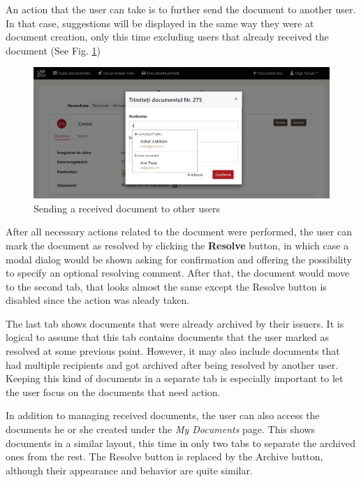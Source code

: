 An action that the user can take is to further send the document to another user. In that case, suggestions will be displayed in the same way they were at document creation, only this time excluding users that already received the document (See Fig. \ref{resendModal})

\begin{figure}[ht]
    \centering
    \includegraphics[width=5.5in]{images/app/received_resend_modal}
    \caption{Sending a received document to other users}
    \label{resendModal}
\end{figure}

After all necessary actions related to the document were performed, the user can mark the document as resolved by clicking the \textbf{Resolve} button, in which case a modal dialog would be shown asking for confirmation and offering the possibility to specify an optional resolving comment. After that, the document would move to the second tab, that looks almost the same except the Resolve button is disabled since the action was aleady taken.

The last tab shows documents that were already archived by their issuers. It is logical to assume that this tab contains documents that the user marked as resolved at some previous point. However, it may also include documents that had multiple recipients and got archived after being resolved by another user. Keeping this kind of documents in a separate tab is especially important to let the user focus on the documents that need action.

In addition to managing received documents, the user can also access the documents he or she created under the \textit{My Documents} page. This shows documents in a similar layout, this time in only two tabs to separate the archived ones from the rest. The Resolve button is replaced by the Archive button, although their appearance and behavior are quite similar.

